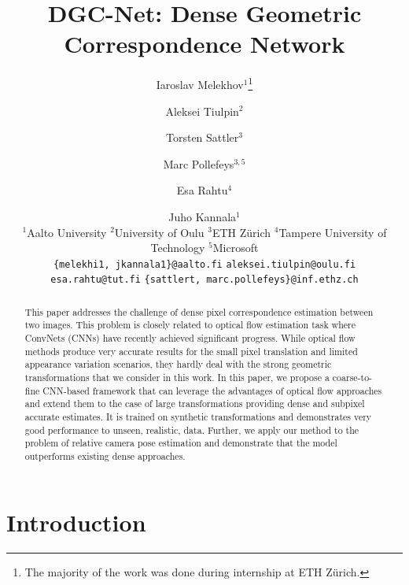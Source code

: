 \documentclass[10pt,twocolumn,letterpaper]{article}
\author{
    Iaroslav Melekhov$^1$\thanks{The majority of the work was done during internship at ETH Z{\"u}rich.} \\
\and
    Aleksei Tiulpin$^2$ \\
\and
    Torsten Sattler$^3$ \\
\and
    Marc Pollefeys$^{3,5}$ \\
\and
    Esa Rahtu$^4$\\
\and
    Juho Kannala$^1$\\
    \small$^1$Aalto University \hspace{1pt} $^2$University of Oulu \hspace{1pt} $^3$ETH Z{\"u}rich \hspace{1pt} $^4$Tampere University of Technology \hspace{1pt} $^5$Microsoft\\
    \small\texttt{\{melekhi1, jkannala1\}@aalto.fi} \hspace{2.5pt} \texttt{aleksei.tiulpin@oulu.fi}\\
    \small\texttt{esa.rahtu@tut.fi} \hspace{2.5pt} \texttt{\{sattlert, marc.pollefeys\}@inf.ethz.ch}\\
}
\begin{document}
\title{DGC-Net: Dense Geometric Correspondence Network}

\maketitle


\begin{abstract}
This paper addresses the challenge of dense pixel correspondence estimation between two images. This problem is closely related to optical flow estimation task where ConvNets (CNNs) have recently achieved significant progress. While optical flow methods produce very accurate results for the small pixel translation and limited appearance variation scenarios, they hardly deal with the strong geometric transformations that we consider in this work. In this paper, we propose a coarse-to-fine CNN-based framework that can leverage the advantages of optical flow approaches and extend them to the case of large transformations providing dense and subpixel accurate estimates. It is trained on synthetic transformations and demonstrates very good performance to unseen, realistic, data. Further, we apply our method to the problem of relative camera pose estimation and demonstrate that the model outperforms existing dense approaches. \end{abstract}

\section{Introduction}
\end{document}
